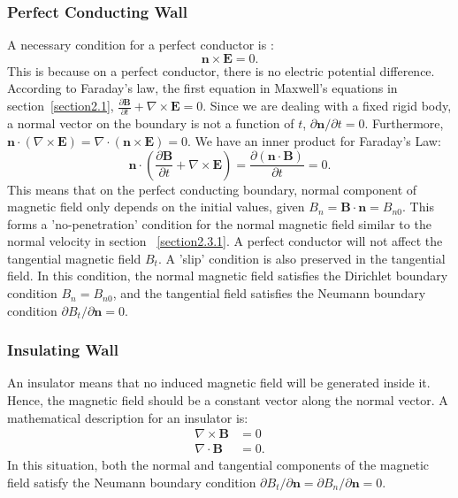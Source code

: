 \subsubsection{Perfect Conducting Wall}
A necessary condition for a perfect conductor is \cite{yanagisawa1991fixed,ju2023incompressible}: $$\mathbf{n}\times\mathbf{E}=0.$$ This is because on a perfect conductor, there is no electric potential difference. According to Faraday's law, the first equation in Maxwell's equations in section~\ref{section2.1}, $\frac{\partial \mathbf{B}}{\partial t} + \nabla \times\mathbf{E} = 0$. Since we are dealing with a fixed rigid body, a normal vector on the boundary is not a function of $t$, $\partial \mathbf{n}/\partial t=0$. Furthermore, $\mathbf{n}\cdot\left(\nabla\times\mathbf{E}\right)=\nabla\cdot\left(\mathbf{n}\times\mathbf{E}\right)=0$. We have an inner product for Faraday's Law:
$$\mathbf{n}\cdot(\frac{\partial \mathbf{B}}{\partial t} + \nabla \times\mathbf{E})=\frac{\partial \left(\mathbf{n}\cdot\mathbf{B}\right)}{\partial t}= 0.$$
This means that on the perfect conducting boundary, normal component of magnetic field only depends on the initial values, given $B_n=\mathbf{B}\cdot\mathbf{n}=B_{n0}$. This forms a 'no-penetration' condition \cite{clauser2021iter} for the normal magnetic field similar to the normal velocity in section ~\ref{section2.3.1}. A perfect conductor will not affect the tangential magnetic field $B_t$. A 'slip' condition is also preserved in the tangential field. In this condition, the normal magnetic field satisfies the Dirichlet boundary condition $B_n=B_{n0}$, and the tangential field satisfies the Neumann boundary condition $\partial B_t/\partial \mathbf{n}=0$.
\subsubsection{Insulating Wall}
An insulator means that no induced magnetic field will be generated inside it. Hence, the magnetic field should be a constant vector along the normal vector. A mathematical description \cite{freidberg2014ideal} for an insulator is:
\begin{align*}
\nabla \times \mathbf{B} &= 0 \\
\nabla \cdot \mathbf{B} &= 0.
\end{align*}
In this situation, both the normal and tangential components of the magnetic field satisfy the Neumann boundary condition $\partial B_t/\partial \mathbf{n} = \partial B_n/\partial \mathbf{n} = 0$.

